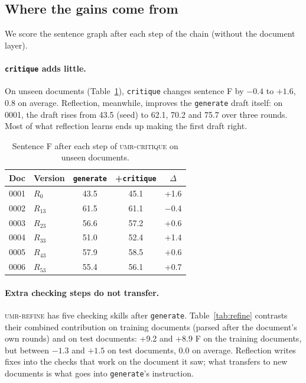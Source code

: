 \documentclass[11pt]{article}
\newcommand{\sys}{\textsc{umr-critique}\xspace}
\newcommand{\refine}{\textsc{umr-refine}\xspace}
\newcommand{\skill}[1]{\texttt{#1}}
\begin{document}
\subsection{Where the gains come from}

We score the sentence graph after each step of the chain (without the document layer).

\paragraph{\skill{critique} adds little.}
On unseen documents (Table~\ref{tab:steps}), \skill{critique} changes sentence F by $-0.4$ to $+1.6$, 0.8 on average. Reflection, meanwhile, improves the \skill{generate} draft itself: on 0001, the draft rises from 43.5 (seed) to 62.1, 70.2 and 75.7 over three rounds. Most of what reflection learns ends up making the first draft right.

\begin{table}[t]
\centering\small
\setlength{\tabcolsep}{4pt}
\begin{tabular}{@{}llccc@{}}
\toprule
Doc & Version & \skill{generate} & +\skill{critique} & $\Delta$ \\
\midrule
0001 & $R_0$ & 43.5 & 45.1 & +1.6 \\
0002 & $R_{13}$ & 61.5 & 61.1 & $-$0.4 \\
0003 & $R_{23}$ & 56.6 & 57.2 & +0.6 \\
0004 & $R_{33}$ & 51.0 & 52.4 & +1.4 \\
0005 & $R_{43}$ & 57.9 & 58.5 & +0.6 \\
0006 & $R_{53}$ & 55.4 & 56.1 & +0.7 \\
\bottomrule
\end{tabular}
\caption{Sentence F after each step of \sys on unseen documents.}
\label{tab:steps}
\end{table}

\paragraph{Extra checking steps do not transfer.}
\refine has five checking skills after \skill{generate}. Table~\ref{tab:refine} contrasts their combined contribution on training documents (parsed after the document's own rounds) and on test documents: +9.2 and +8.9 F on the training documents, but between $-1.3$ and $+1.5$ on test documents, 0.0 on average. Reflection writes fixes into the checks that work on the document it saw; what transfers to new documents is what goes into \skill{generate}'s instruction.
\end{document}
